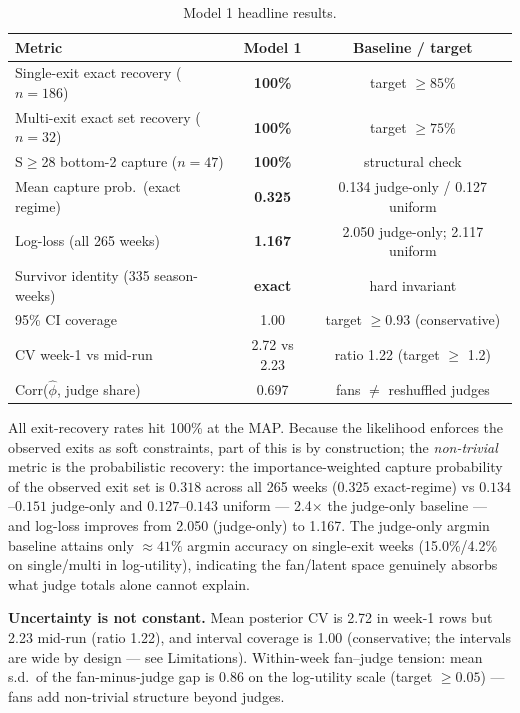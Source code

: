 \documentclass[11pt]{article}
\begin{document}
\begin{table}[H]
\centering
\caption{Model 1 headline results.}
\label{tab:m1results}
\small
\begin{tabular}{lcc}
\toprule
Metric & Model 1 & Baseline / target \\
\midrule
Single-exit exact recovery ($n=186$) & \textbf{100\%} & target $\ge 85\%$ \\
Multi-exit exact set recovery ($n=32$) & \textbf{100\%} & target $\ge 75\%$ \\
S$\ge$28 bottom-2 capture ($n=47$) & \textbf{100\%} & structural check \\
Mean capture prob.\ (exact regime) & \textbf{0.325} & 0.134 judge-only / 0.127 uniform \\
Log-loss (all 265 weeks) & \textbf{1.167} & 2.050 judge-only; 2.117 uniform \\
Survivor identity (335 season-weeks) & \textbf{exact} & hard invariant \\
95\% CI coverage & 1.00 & target $\ge 0.93$ (conservative) \\
CV week-1 vs mid-run & 2.72 vs 2.23 & ratio 1.22 (target $\ge$ 1.2) \\
Corr($\hat\phi$, judge share) & 0.697 & fans $\neq$ reshuffled judges \\
\bottomrule
\end{tabular}
\end{table}

All exit-recovery rates hit 100\% at the MAP. Because the likelihood enforces the
observed exits as soft constraints, part of this is by construction; the
\emph{non-trivial} metric is the probabilistic recovery: the importance-weighted
capture probability of the observed exit set is $0.318$ across all 265 weeks
($0.325$ exact-regime) vs $0.134$--$0.151$ judge-only and $0.127$--$0.143$
uniform --- 2.4$\times$ the judge-only baseline --- and log-loss improves from 2.050
(judge-only) to 1.167. The judge-only argmin baseline attains only $\approx 41\%$
argmin accuracy on single-exit weeks (15.0\%/4.2\% on single/multi in log-utility),
indicating the fan/latent space genuinely absorbs what judge totals alone cannot
explain.

\textbf{Uncertainty is not constant.} Mean posterior CV is 2.72 in week-1 rows but
2.23 mid-run (ratio 1.22), and interval coverage is 1.00 (conservative; the
intervals are wide by design --- see Limitations). Within-week fan--judge tension:
mean s.d.\ of the fan-minus-judge gap is 0.86 on the log-utility scale (target
$\ge 0.05$) --- fans add non-trivial structure beyond judges.
\end{document}
